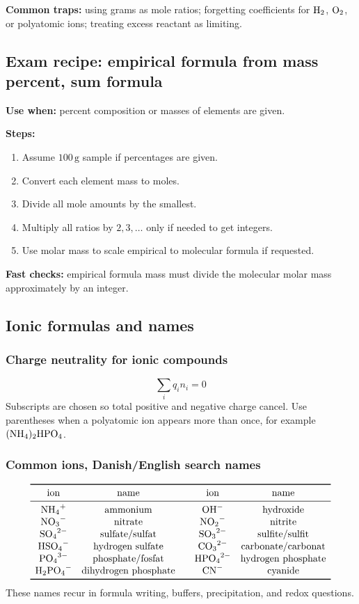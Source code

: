 \textbf{Common traps:} using grams as mole ratios; forgetting coefficients for \(\ce{H2}\), \(\ce{O2}\), or polyatomic ions; treating excess reactant as limiting.

\subsection{Exam recipe: empirical formula from mass percent, sum formula}
\textbf{Use when:} percent composition or masses of elements are given.

\textbf{Steps:}
\begin{enumerate}
    \item Assume \(100\,\mathrm g\) sample if percentages are given.
    \item Convert each element mass to moles.
    \item Divide all mole amounts by the smallest.
    \item Multiply all ratios by \(2,3,\ldots\) only if needed to get integers.
    \item Use molar mass to scale empirical to molecular formula if requested.
\end{enumerate}

\textbf{Fast checks:} empirical formula mass must divide the molecular molar mass approximately by an integer.

\subsection{Ionic formulas and names}

\subsubsection{Charge neutrality for ionic compounds}
\[
\sum_i q_in_i=0
\]
Subscripts are chosen so total positive and negative charge cancel. Use parentheses when a polyatomic ion appears more than once, for example \(\ce{(NH4)2HPO4}\).

\subsubsection{Common ions, Danish/English search names}
\[
\begin{array}{c c@{\qquad}c c}
\toprule
\text{ion} & \text{name} & \text{ion} & \text{name}\\
\midrule
\ce{NH4+} & \text{ammonium} & \ce{OH-} & \text{hydroxide}\\
\ce{NO3-} & \text{nitrate} & \ce{NO2-} & \text{nitrite}\\
\ce{SO4^2-} & \text{sulfate/sulfat} & \ce{SO3^2-} & \text{sulfite/sulfit}\\
\ce{HSO4-} & \text{hydrogen sulfate} & \ce{CO3^2-} & \text{carbonate/carbonat}\\
\ce{PO4^3-} & \text{phosphate/fosfat} & \ce{HPO4^2-} & \text{hydrogen phosphate}\\
\ce{H2PO4-} & \text{dihydrogen phosphate} & \ce{CN-} & \text{cyanide}\\
\bottomrule
\end{array}
\]
These names recur in formula writing, buffers, precipitation, and redox questions.

